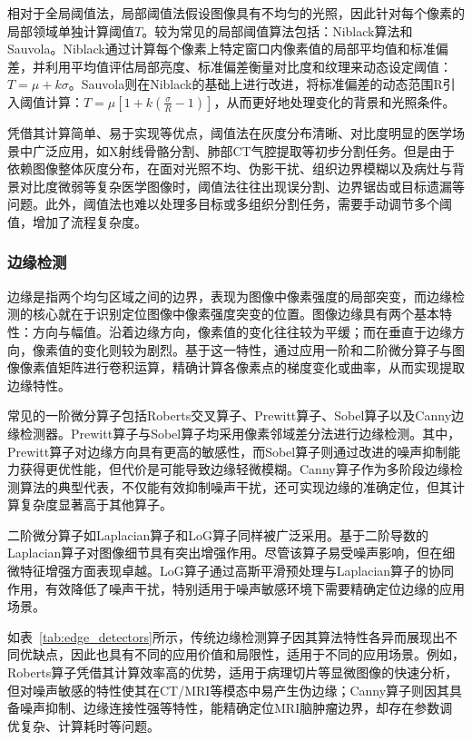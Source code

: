相对于全局阈值法，局部阈值法假设图像具有不均匀的光照，因此针对每个像素的局部领域单独计算阈值$T$。较为常见的局部阈值算法包括：Niblack算法和Sauvola。Niblack通过计算每个像素上特定窗口内像素值的局部平均值和标准偏差，并利用平均值评估局部亮度、标准偏差衡量对比度和纹理来动态设定阈值：$ T=\mu+k \sigma $。Sauvola则在Niblack的基础上进行改进，将标准偏差的动态范围R引入阈值计算：$ T=\mu\left[1+k\left(\frac{\sigma}{R}-1\right)\right] $，从而更好地处理变化的背景和光照条件。

凭借其计算简单、易于实现等优点，阈值法在灰度分布清晰、对比度明显的医学场景中广泛应用，如X射线骨骼分割、肺部CT气腔提取等初步分割任务。但是由于依赖图像整体灰度分布，在面对光照不均、伪影干扰、组织边界模糊以及病灶与背景对比度微弱等复杂医学图像时，阈值法往往出现误分割、边界锯齿或目标遗漏等问题。此外，阈值法也难以处理多目标或多组织分割任务，需要手动调节多个阈值，增加了流程复杂度。

\subsubsection{边缘检测}


边缘是指两个均匀区域之间的边界，表现为图像中像素强度的局部突变，而边缘检测的核心就在于识别定位图像中像素强度突变的位置。图像边缘具有两个基本特性：方向与幅值。沿着边缘方向，像素值的变化往往较为平缓；而在垂直于边缘方向，像素值的变化则较为剧烈。基于这一特性，通过应用一阶和二阶微分算子与图像像素值矩阵进行卷积运算，精确计算各像素点的梯度变化或曲率，从而实现提取边缘特性。

常见的一阶微分算子包括Roberts交叉算子、Prewitt算子、Sobel算子以及Canny边缘检测器。Prewitt算子与Sobel算子均采用像素邻域差分法进行边缘检测。其中，Prewitt算子对边缘方向具有更高的敏感性，而Sobel算子则通过改进的噪声抑制能力获得更优性能，但代价是可能导致边缘轻微模糊。Canny算子作为多阶段边缘检测算法的典型代表，不仅能有效抑制噪声干扰，还可实现边缘的准确定位，但其计算复杂度显著高于其他算子。

二阶微分算子如Laplacian算子和LoG算子同样被广泛采用。基于二阶导数的Laplacian算子对图像细节具有突出增强作用。尽管该算子易受噪声影响，但在细微特征增强方面表现卓越。LoG算子通过高斯平滑预处理与Laplacian算子的协同作用，有效降低了噪声干扰，特别适用于噪声敏感环境下需要精确定位边缘的应用场景。

如表~\ref{tab:edge_detectors}所示，传统边缘检测算子因其算法特性各异而展现出不同优缺点，因此也具有不同的应用价值和局限性，适用于不同的应用场景。例如，Roberts算子凭借其计算效率高的优势，适用于病理切片等显微图像的快速分析，但对噪声敏感的特性使其在CT/MRI等模态中易产生伪边缘；Canny算子则因其具备噪声抑制、边缘连接性强等特性，能精确定位MRI脑肿瘤边界，却存在参数调优复杂、计算耗时等问题。


